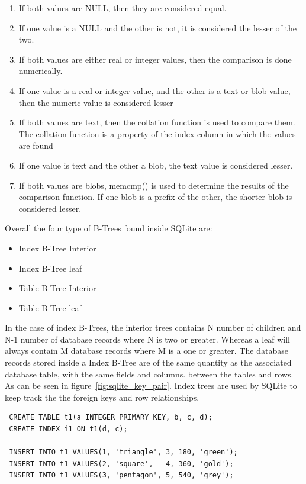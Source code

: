 \begin{enumerate} 
	\item If both values are NULL, then they are considered equal.
	\item If one value is a NULL and the other is not, it is considered the lesser of the two.
	\item If both values are either real or integer values, then the comparison is done numerically.
	\item If one value is a real or integer value, and the other is a text or blob value, then the numeric value is considered lesser
	\item If both values are text, then the collation function is used to compare them. The collation function is a property of the index column in which the values are found
	\item If one value is text and the other a blob, the text value is considered lesser.
	\item If both values are blobs, memcmp() is used to determine the results of the comparison function. If one blob is a prefix of the other, the shorter blob is considered lesser. 
\end{enumerate}
  
Overall the four type of B-Trees found inside SQLite are:

\begin{itemize} 
	\item Index B-Tree Interior
	\item Index B-Tree leaf
	\item Table B-Tree Interior
	\item Table B-Tree leaf 
\end{itemize} 

In the case of index B-Trees, the interior trees contains N number of children and N-1 number of database records where N is two or greater. Whereas a leaf will always contain M database records where M is a one or greater. The database records stored inside a Index B-Tree are of the same quantity as the associated database table, with the same fields and columns. between the tables and rows. As can be seen in figure~\ref{fig:sqlite_key_pair}. Index trees are used by SQLite to keep track the the foreign keys and row relationships.

\begin{lstlisting}
 CREATE TABLE t1(a INTEGER PRIMARY KEY, b, c, d);
 CREATE INDEX i1 ON t1(d, c);

 INSERT INTO t1 VALUES(1, 'triangle', 3, 180, 'green');
 INSERT INTO t1 VALUES(2, 'square',   4, 360, 'gold');
 INSERT INTO t1 VALUES(3, 'pentagon', 5, 540, 'grey');
\end{lstlisting}

